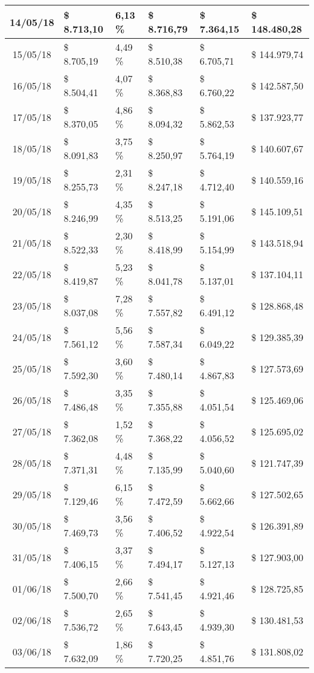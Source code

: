\begin{small}
\begin{longtable}{|c|l|l|l|l|l|}
14/05/18 & \$ 8.713,10 & 6,13 \% & \$ 8.716,79 & \$ 7.364,15 & \$ 148.480,28 \\ \hline
15/05/18 & \$ 8.705,19 & 4,49 \% & \$ 8.510,38 & \$ 6.705,71 & \$ 144.979,74 \\ \hline
16/05/18 & \$ 8.504,41 & 4,07 \% & \$ 8.368,83 & \$ 6.760,22 & \$ 142.587,50 \\ \hline
17/05/18 & \$ 8.370,05 & 4,86 \% & \$ 8.094,32 & \$ 5.862,53 & \$ 137.923,77 \\ \hline
18/05/18 & \$ 8.091,83 & 3,75 \% & \$ 8.250,97 & \$ 5.764,19 & \$ 140.607,67 \\ \hline
19/05/18 & \$ 8.255,73 & 2,31 \% & \$ 8.247,18 & \$ 4.712,40 & \$ 140.559,16 \\ \hline
20/05/18 & \$ 8.246,99 & 4,35 \% & \$ 8.513,25 & \$ 5.191,06 & \$ 145.109,51 \\ \hline
21/05/18 & \$ 8.522,33 & 2,30 \% & \$ 8.418,99 & \$ 5.154,99 & \$ 143.518,94 \\ \hline
22/05/18 & \$ 8.419,87 & 5,23 \% & \$ 8.041,78 & \$ 5.137,01 & \$ 137.104,11 \\ \hline
23/05/18 & \$ 8.037,08 & 7,28 \% & \$ 7.557,82 & \$ 6.491,12 & \$ 128.868,48 \\ \hline
24/05/18 & \$ 7.561,12 & 5,56 \% & \$ 7.587,34 & \$ 6.049,22 & \$ 129.385,39 \\ \hline
25/05/18 & \$ 7.592,30 & 3,60 \% & \$ 7.480,14 & \$ 4.867,83 & \$ 127.573,69 \\ \hline
26/05/18 & \$ 7.486,48 & 3,35 \% & \$ 7.355,88 & \$ 4.051,54 & \$ 125.469,06 \\ \hline
27/05/18 & \$ 7.362,08 & 1,52 \% & \$ 7.368,22 & \$ 4.056,52 & \$ 125.695,02 \\ \hline
28/05/18 & \$ 7.371,31 & 4,48 \% & \$ 7.135,99 & \$ 5.040,60 & \$ 121.747,39 \\ \hline
29/05/18 & \$ 7.129,46 & 6,15 \% & \$ 7.472,59 & \$ 5.662,66 & \$ 127.502,65 \\ \hline
30/05/18 & \$ 7.469,73 & 3,56 \% & \$ 7.406,52 & \$ 4.922,54 & \$ 126.391,89 \\ \hline
31/05/18 & \$ 7.406,15 & 3,37 \% & \$ 7.494,17 & \$ 5.127,13 & \$ 127.903,00 \\ \hline
01/06/18 & \$ 7.500,70 & 2,66 \% & \$ 7.541,45 & \$ 4.921,46 & \$ 128.725,85 \\ \hline
02/06/18 & \$ 7.536,72 & 2,65 \% & \$ 7.643,45 & \$ 4.939,30 & \$ 130.481,53 \\ \hline
03/06/18 & \$ 7.632,09 & 1,86 \% & \$ 7.720,25 & \$ 4.851,76 & \$ 131.808,02 \\ \hline

\end{longtable}
\end{small}

